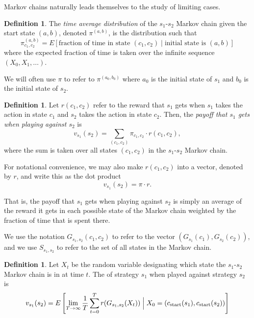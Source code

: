 \documentclass[11pt]{amsart}
\theoremstyle{definition}
\newtheorem{definition}[theorem]{Definition}
\theoremstyle{remark}
\begin{document}
Markov chains naturally leads themselves to the study of limiting cases.

\begin{definition}
  \label{timeaveragedistribution}
  The \textit{time average distribution} of the $s_1$-$s_2$ Markov chain given the start state $(a, b)$, denoted $\pi^{(a, b)}$, is the distribution such that \begin{equation*}
    \pi_{c_1, c_2}^{(a, b)} = E \left[ \text{fraction of time in state $(c_1,c_2)$} \mid \text{initial state is } (a, b)  \right]
  \end{equation*}
  where the expected fraction of time is taken over the infinite sequence $(X_0, X_1, \ldots)$.
\end{definition}

We will often use $\pi$ to refer to $\pi^{(a_0, b_0)}$ where $a_0$ is the initial state of $s_1$ and $b_0$ is the initial state of $s_2$.

\begin{definition}
  \label{payofftimeaverage}
  Let $r(c_1, c_2)$ refer to the reward that $s_1$ gets when $s_1$ takes the action in state $c_1$ and $s_2$ takes the action in state $c_2$. Then, the \textit{payoff that $s_1$ gets when playing against $s_2$} is
  \begin{equation*}
    v_{s_1}(s_2) = \sum_{(c_1,c_2)} \pi_{c_1,c_2} \cdot r(c_1, c_2),
  \end{equation*}
  where the sum is taken over all states $(c_1,c_2)$ in the $s_1$-$s_2$ Markov chain.
\end{definition}

For notational convenience, we may also make $r(c_1, c_2)$ into a vector, denoted by $r$, and write this as the dot product \begin{equation*}
  v_{s_1}(s_2) = \pi \cdot r.
\end{equation*}

That is, the payoff that $s_1$ gets when playing against $s_2$ is simply an average of the reward it gets in each possible state of the Markov chain weighted by the fraction of time that is spent there.

\iffalse
We use the notation $G_{s_1,s_2}(c_1,c_2)$ to refer to the vector $(G_{s_1}(c_1), G_{s_2}(c_2))$, and we use $S_{s_1,s_2}$ to refer to the set of all states in the Markov chain.

\begin{definition}
  \label{strategypayoffs}
  Let $X_t$ be the random variable designating which state the $s_1$-$s_2$ Markov chain is in at time $t$. The  of strategy $s_1$ when played against strategy $s_2$ is 
  \begin{equation*}
    v_{s_1}(s_2) = E \left[ \lim_{T \to \infty} \frac{1}{T} \sum_{t=0}^T r(G_{s_1,s_2} (X_t)) \Bigm| X_0 = (c_{\text{start}}(s_1), c_{\text{start}}(s_2)) \right]
  \end{equation*}
\end{definition}
\end{document}
